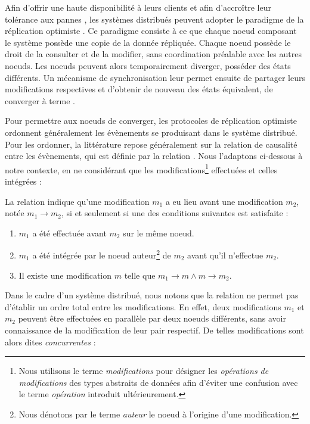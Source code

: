 \label{sec:etat-art-crdts-intro}

Afin d'offrir une haute disponibilité à leurs clients et afin d'accroître leur tolérance aux pannes \cite{2016-trade-offs-replicated-systems-guerraoui}, les systèmes distribués peuvent adopter le paradigme de la réplication optimiste \cite{2005-optimistic-replication-saito}.
Ce paradigme consiste à ce que chaque noeud composant le système possède une copie de la donnée répliquée.
Chaque noeud possède le droit de la consulter et de la modifier, sans coordination préalable avec les autres noeuds.
Les noeuds peuvent alors temporairement diverger, \ie posséder des états différents.
Un mécanisme de synchronisation leur permet ensuite de partager leurs modifications respectives et d'obtenir de nouveau des états équivalent, \ie de converger à terme \cite{10.1145/224057.224070}.

Pour permettre aux noeuds de converger, les protocoles de réplication optimiste ordonnent généralement les évènements se produisant dans le système distribué.
Pour les ordonner, la littérature repose généralement sur la relation de causalité entre les évènements, qui est définie par la relation \hb \cite{1978-happen-before-lamport}.
Nous l'adaptons ci-dessous à notre contexte, en ne considérant que les modifications\footnote{Nous utilisons le terme \emph{modifications} pour désigner les \emph{opérations de modifications} des types abstraits de données afin d'éviter une confusion avec le terme \emph{opération} introduit ultérieurement.} effectuées et celles intégrées :

\begin{definition}[Relation \hb]
  \label{def:happens-before}
  La relation \hb indique qu'une modification $m_1$ a eu lieu avant une modification $m_2$, notée $m_1 \rightarrow m_2$, si et seulement si une des conditions suivantes est satisfaite :
  \begin{enumerate}
    \item $m_1$ a été effectuée avant $m_2$ sur le même noeud.
    \item $m_1$ a été intégrée par le noeud auteur\footnote{Nous dénotons par le terme \emph{auteur} le noeud à l'origine d'une modification.} de $m_2$ avant qu'il n'effectue $m_2$.
    \item Il existe une modification $m$ telle que $m_1 \rightarrow m \land m \rightarrow m_2$.
  \end{enumerate}
\end{definition}

Dans le cadre d'un système distribué, nous notons que la relation \hb ne permet pas d'établir un ordre total entre les modifications.
En effet, deux modifications $m_1$ et $m_2$ peuvent être effectuées en parallèle par deux noeuds différents, sans avoir connaissance de la modification de leur pair respectif.
De telles modifications sont alors dites \emph{concurrentes} :

